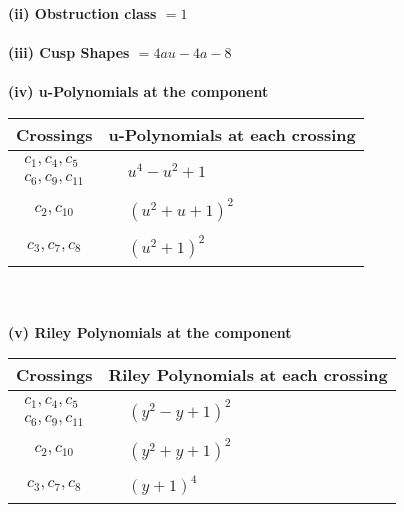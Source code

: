 \documentclass[1p]{elsarticle_modified}
\theoremstyle{definition}
\begin{document}
\flushleft \textbf{(ii) Obstruction class $= 1$}\\~\\
\flushleft \textbf{(iii) Cusp Shapes $= 4 a u-4 a-8$}\\~\\
\newpage\renewcommand{\arraystretch}{1}
\flushleft \textbf{(iv) u-Polynomials at the component}\newline \\
\begin{tabular}{m{50pt}|m{274pt}}
Crossings & \hspace{64pt}u-Polynomials at each crossing \\
\hline $$\begin{aligned}c_{1},c_{4},c_{5}\\c_{6},c_{9},c_{11}\end{aligned}$$&$\begin{aligned}
&u^4- u^2+1
\end{aligned}$\\
\hline $$\begin{aligned}c_{2},c_{10}\end{aligned}$$&$\begin{aligned}
&(u^2+u+1)^2
\end{aligned}$\\
\hline $$\begin{aligned}c_{3},c_{7},c_{8}\end{aligned}$$&$\begin{aligned}
&(u^2+1)^2
\end{aligned}$\\
\hline
\end{tabular}\\~\\
\newpage\renewcommand{\arraystretch}{1}
\flushleft \textbf{(v) Riley Polynomials at the component}\newline \\
\begin{tabular}{m{50pt}|m{274pt}}
Crossings & \hspace{64pt}Riley Polynomials at each crossing \\
\hline $$\begin{aligned}c_{1},c_{4},c_{5}\\c_{6},c_{9},c_{11}\end{aligned}$$&$\begin{aligned}
&(y^2- y+1)^2
\end{aligned}$\\
\hline $$\begin{aligned}c_{2},c_{10}\end{aligned}$$&$\begin{aligned}
&(y^2+y+1)^2
\end{aligned}$\\
\hline $$\begin{aligned}c_{3},c_{7},c_{8}\end{aligned}$$&$\begin{aligned}
&(y+1)^4
\end{aligned}$\\
\hline
\end{tabular}\\~\\
\end{document}
